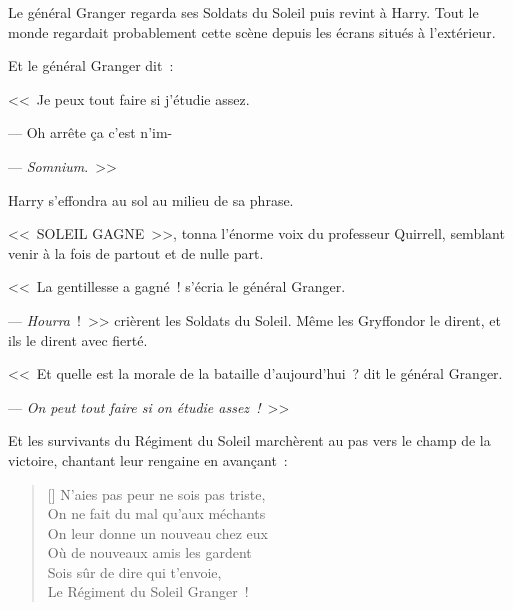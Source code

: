 Le général Granger regarda ses Soldats du Soleil puis revint à Harry. Tout le monde regardait probablement cette scène depuis les écrans situés à l'extérieur.

Et le général Granger dit~:

<<~Je peux tout faire si j'étudie assez.

--- Oh arrête ça c'est n'im-

--- \emph{Somnium}.~>>

Harry s'effondra au sol au milieu de sa phrase.

<<~SOLEIL GAGNE~>>, tonna l'énorme voix du professeur Quirrell, semblant venir à la fois de partout et de nulle part.

<<~La gentillesse a gagné~! s'écria le général Granger.

--- \emph{Hourra}~!~>> crièrent les Soldats du Soleil. Même les Gryffondor le dirent, et ils le dirent avec fierté.

<<~Et quelle est la morale de la bataille d'aujourd'hui~? dit le général Granger.

--- \emph{On peut tout faire si on étudie assez~!}~>>

Et les survivants du Régiment du Soleil marchèrent au pas vers le champ de la victoire, chantant leur rengaine en avançant~:

\begin{verse}[\versewidth]
N'aies pas peur ne sois pas triste,\\
On ne fait du mal qu'aux méchants\\
On leur donne un nouveau chez eux\\
Où de nouveaux amis les gardent\\
Sois sûr de dire qui t'envoie,\\
Le Régiment du Soleil Granger~!
\end{verse}

